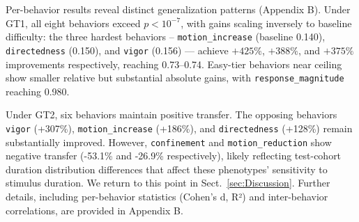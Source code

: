 \documentclass{article}
\begin{document}
Per-behavior results reveal distinct generalization patterns (Appendix B). Under GT1, all eight behaviors exceed $p < 10^{-7}$, with gains scaling inversely to baseline difficulty: the three hardest behaviors -- \texttt{motion\_increase} (baseline 0.140), \texttt{directedness} (0.150), and \texttt{vigor} (0.156) --- achieve $+425\%$, $+388\%$, and $+375\%$ improvements respectively, reaching 0.73--0.74. Easy-tier behaviors near ceiling show smaller relative but substantial absolute gains, with \texttt{response\_magnitude} reaching 0.980.

Under GT2, six behaviors maintain positive transfer. The opposing behaviors \texttt{vigor} (+307\%), \texttt{motion\_increase} (+186\%), and \texttt{directedness} (+128\%) remain substantially improved. However, \texttt{confinement} and \texttt{motion\_reduction} show negative transfer (-53.1\% and -26.9\% respectively), likely reflecting test-cohort duration distribution differences that affect these phenotypes' sensitivity to stimulus duration. We return to this point in Sect.~\ref{sec:Discussion}. Further details, including per-behavior statistics (Cohen's d, R²) and inter-behavior correlations, are provided in Appendix B.
\end{document}
